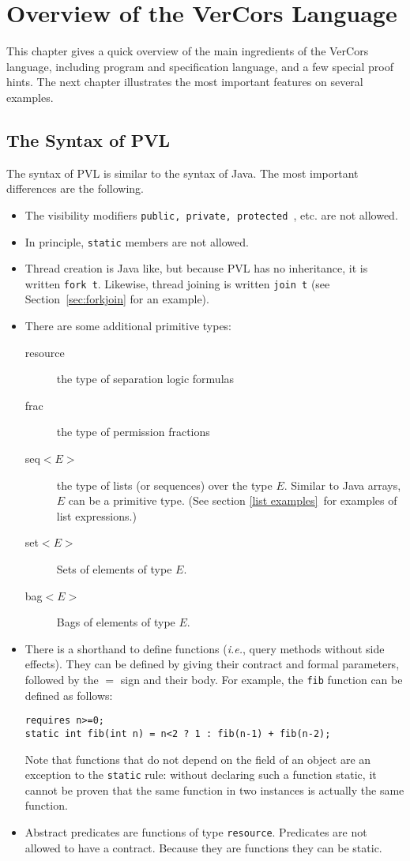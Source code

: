 \chapter{Overview of the VerCors Language}

This chapter gives a quick overview of the main ingredients of the
VerCors language, including program and specification language, and a
few special proof hints. The next chapter illustrates the most
important features on several examples.
 
\section{The Syntax of PVL}

The syntax of PVL is similar to the syntax of Java.
The most important differences are the following.
\begin{itemize}
\item The visibility modifiers \lstinline+public, private, protected +, etc. are not allowed.
\item In principle, \lstinline+static+ members are not allowed.
\item Thread creation is Java like, but because PVL has no inheritance, it
is written \lstinline+fork t+. Likewise, thread joining
is written \lstinline+join t+ (see Section~\ref{sec:forkjoin} for an example).
\item There are some additional primitive types:
\begin{description}
\item[resource] the type of separation logic formulas
\item[frac] the type of permission fractions
\item[seq$<E>$] the type of lists (or sequences) over the type \(E\).
Similar to Java arrays, \(E\) can be a primitive type. (See
section \ref{list examples}\ for examples of list expressions.)
\item[set$<E>$] Sets of elements of type $E$.
\item[bag$<E>$] Bags of elements of type $E$.
\end{description}
\item There is a shorthand to define functions (\emph{i.e.}, query
  methods without side effects). They can be defined by giving their
  contract and
formal parameters, followed by the $=$ sign and their body. For
example, the \lstinline+fib+ function can be defined as follows:
\begin{verbatim}
requires n>=0;
static int fib(int n) = n<2 ? 1 : fib(n-1) + fib(n-2);
\end{verbatim}
Note that functions that do not depend on the field of an object are an
exception to the \lstinline+static+ rule:
without declaring such a function static, it cannot be proven that the same function
in two instances is actually the same function.
\item Abstract predicates are functions of type \lstinline+resource+.
Predicates are not allowed to have a contract. Because they are functions they can be static.
\end{itemize}

